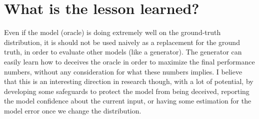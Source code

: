\section{What is the lesson learned?}
  \par Even if the model (oracle) is doing extremely well on the ground-truth distribution, it is should not be used naively as a replacement for the ground truth, in order to evaluate other models (like a generator). The generator can easily learn how to deceives the oracle in order to maximize the final performance numbers, without any consideration for what these numbers implies. I believe that this is an interesting direction in research though, with a lot of potential, by developing some safeguards to protect the model from being deceived, reporting the model confidence about the current input, or having some estimation for the model error once we change the distribution.
